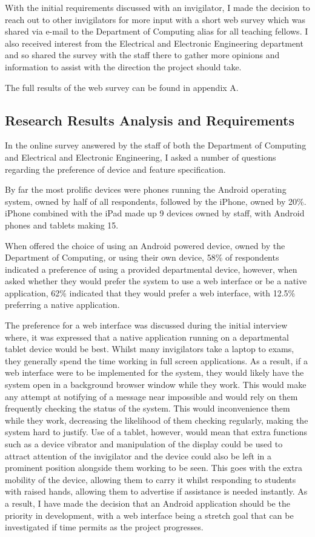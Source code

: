 With the initial requirements discussed with an invigilator, I made the decision to reach out to other invigilators for more input with a short web survey which was shared via e-mail to the Department of Computing alias for all teaching fellows.  I also received interest from the Electrical and Electronic Engineering department and so shared the survey with the staff there to gather more opinions and information to assist with the direction the project should take.

The full results of the web survey can be found in appendix A.

\subsection{Research Results Analysis and Requirements}

In the online survey answered by the staff of both the Department of Computing and Electrical and Electronic Engineering, I asked a number of questions regarding the preference of device and feature specification.

By far the most prolific devices were phones running the Android operating system, owned by half of all respondents, followed by the iPhone, owned by 20\%.  iPhone combined with the iPad made up 9 devices owned by staff, with Android phones and tablets making 15.

When offered the choice of using an Android powered device, owned by the Department of Computing, or using their own device, 58\% of respondents indicated a preference of using a provided departmental device, however, when asked whether they would prefer the system to use a web interface or be a native application, 62\% indicated that they would prefer a web interface, with 12.5\% preferring a native application.

The preference for a web interface was discussed during the initial interview where, it was expressed that a native application running on a departmental tablet device would be best.  Whilst many invigilators take a laptop to exams, they generally spend the time working in full screen applications.  As a result, if a web interface were to be implemented for the system, they would likely have the system open in a background browser window while they work.  This would make any attempt at notifying of a message near impossible and would rely on them frequently checking the status of the system.  This would inconvenience them while they work, decreasing the likelihood of them checking regularly, making the system hard to justify.  Use of a tablet, however, would mean that extra functions such as a device vibrator and manipulation of the display could be used to attract attention of the invigilator and the device could also be left in a prominent position alongside them working to be seen.  This goes with the extra mobility of the device, allowing them to carry it whilst responding to students with raised hands, allowing them to advertise if assistance is needed instantly.  As a result, I have made the decision that an Android application should be the priority in development, with a web interface being a stretch goal that can be investigated if time permits as the project progresses.

